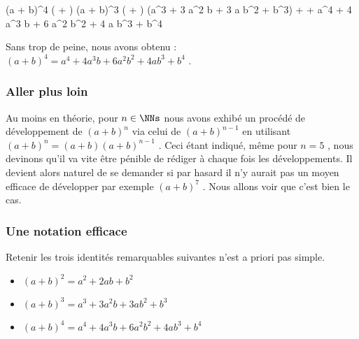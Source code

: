 \medskip

\begin{stepcalc}[style = sar]
	(a + b)^4
		\explnext{}
	( + ) (a + b)^3
		\explnext{}
	( + ) (a^3 + 3 a^2 b + 3 a b^2 + b^3)
		\explnext{}
	+
		\explnext{}
	+
		\explnext{}
	a^4 + 4 a^3 b + 6 a^2 b^2 + 4 a b^3 + b^4
\end{stepcalc}

\medskip

Sans trop de peine, nous avons obtenu :
$(a + b)^4 = a^4 + 4 a^3 b + 6 a^2 b^2 + 4 a b^3 + b^4$ .




\subsubsection{Aller plus loin}

Au moins en théorie, pour $n \in \NNs$ nous avons exhibé un procédé de développement de $(a + b)^n$ via celui de $(a + b)^{n - 1}$ en utilisant $(a + b)^n = (a + b) (a + b)^{n - 1}$ .
Ceci étant indiqué, même pour $n = 5$ , nous devinons qu'il va vite être pénible de rédiger à chaque fois les développements.
Il devient alors naturel de se demander si par hasard il n'y aurait pas un moyen efficace de développer par exemple $(a + b)^7$ . Nous allons voir que c'est bien le cas.




\subsubsection{Une notation efficace}

Retenir les trois identités remarquables suivantes n'est a priori pas simple.

\begin{itemize}[label = \small\textbullet]
	\item $(a + b)^2 = a^2 + 2 a b + b^2$

	\item $(a + b)^3 = a^3 + 3 a^2 b + 3 a b^2 + b^3$

	\item $(a + b)^4 = a^4 + 4 a^3 b + 6 a^2 b^2 + 4 a b^3 + b^4$
\end{itemize}

